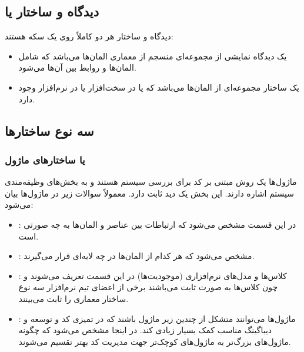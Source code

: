 \documentclass[a4paper]{article}
\begin{document}
\subsection{دیدگاه و ساختار یا }

دیدگاه و ساختار هر دو کاملاً روی یک سکه هستند:

\begin{itemize}
    \item یک دیدگاه نمایشی از مجموعه‌ای منسجم از معماری المان‌ها می‌باشد که شامل
    المان‌ها و روابط بین آن‌ها می‌شود.
    \item یک ساختار مجموعه‌ای از المان‌ها می‌باشد که یا در سخت‌افزار یا در
    نرم‌افزار وجود دارد.
\end{itemize}

\subsection{سه نوع ساختار‌ها}

\subsubsection{ یا ساختار‌های ماژول}

ماژول‌ها یک روش مبتنی بر کد برای بررسی سیستم هستند و به بخش‌های وظیفه‌مندی سیستم
اشاره دارند. این بخش یک دید ثابت دارد. معمولاً سوالات زیر در ماژول‌ها بیان
می‌شود:

\begin{itemize}
    \item {}: در این قسمت مشخص می‌شود که ارتباطات بین عناصر و المان‌ها به
    چه صورتی است.
    \item {}: مشخص می‌شود که هر کدام از المان‌ها در چه لایه‌ای قرار
    می‌گیرند.
    \item {}: کلاس‌ها و مدل‌های نرم‌افزاری (موجودیت‌ها) در این قسمت
    تعریف می‌شوند و چون کلاس‌ها به صورت ثابت می‌باشند برخی از اعضای تیم
    نرم‌افزار سه نوع ساختار معماری را ثابت می‌بینند.
    \item {}: ماژول‌ها می‌توانند متشکل از چندین زیر ماژول باشند
    که در تمیزی کد و توسعه و دیباگینگ مناسب کمک بسیار زیادی کند. در اینجا مشخص
    می‌شود که چگونه ماژول‌های بزرگ‌تر به ماژول‌های کوچک‌تر جهت مدیریت کد بهتر
    تقسیم می‌شوند.
\end{itemize}

\subsubsection{}
\end{document}
